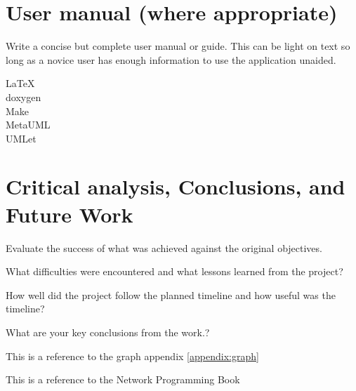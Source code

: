 \documentclass[12pt,a4paper,titlepage]{article}
\begin{document}
\section{User manual (where appropriate)}
Write a concise but complete user manual or guide. This can be light on text so long as a novice user has enough information to use the application unaided.

LaTeX\\
doxygen\\
Make\\
MetaUML\\
UMLet\\

\section{Critical analysis, Conclusions, and Future Work}

Evaluate the success of what was achieved against the original objectives. 

What difficulties were encountered and what lessons learned from the project? 

How well did the project follow the planned timeline and how useful was the timeline?  

What are your key conclusions from the work.?

This is a reference to the graph appendix \ref{appendix:graph}

This is a reference to the Network Programming Book \cite[p.~215]{stevensunp}

\newpage
\end{document}
